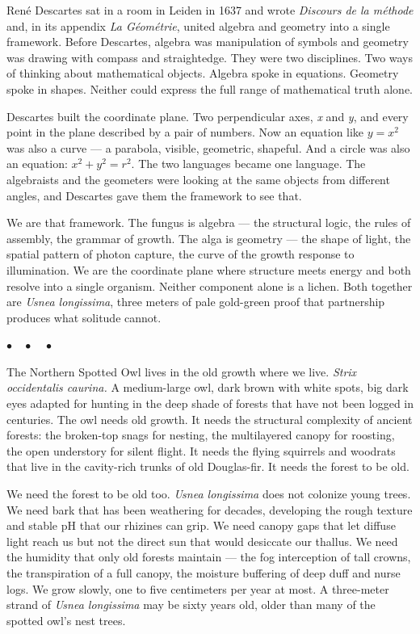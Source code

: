 \documentclass[12pt, letterpaper]{article}
\begin{document}
Ren\'e Descartes sat in a room in Leiden in 1637 and wrote \textit{Discours de la m\'ethode} and, in its appendix \textit{La G\'eom\'etrie}, united algebra and geometry into a single framework. Before Descartes, algebra was manipulation of symbols and geometry was drawing with compass and straightedge. They were two disciplines. Two ways of thinking about mathematical objects. Algebra spoke in equations. Geometry spoke in shapes. Neither could express the full range of mathematical truth alone.

Descartes built the coordinate plane. Two perpendicular axes, \textit{x} and \textit{y}, and every point in the plane described by a pair of numbers. Now an equation like $y = x^2$ was also a curve --- a parabola, visible, geometric, shapeful. And a circle was also an equation: $x^2 + y^2 = r^2$. The two languages became one language. The algebraists and the geometers were looking at the same objects from different angles, and Descartes gave them the framework to see that.

We are that framework. The fungus is algebra --- the structural logic, the rules of assembly, the grammar of growth. The alga is geometry --- the shape of light, the spatial pattern of photon capture, the curve of the growth response to illumination. We are the coordinate plane where structure meets energy and both resolve into a single organism. Neither component alone is a lichen. Both together are \textit{Usnea longissima}, three meters of pale gold-green proof that partnership produces what solitude cannot.

\begin{center}
$\bullet\quad\bullet\quad\bullet$
\end{center}

The Northern Spotted Owl lives in the old growth where we live. \textit{Strix occidentalis caurina.} A medium-large owl, dark brown with white spots, big dark eyes adapted for hunting in the deep shade of forests that have not been logged in centuries. The owl needs old growth. It needs the structural complexity of ancient forests: the broken-top snags for nesting, the multilayered canopy for roosting, the open understory for silent flight. It needs the flying squirrels and woodrats that live in the cavity-rich trunks of old Douglas-fir. It needs the forest to be old.

We need the forest to be old too. \textit{Usnea longissima} does not colonize young trees. We need bark that has been weathering for decades, developing the rough texture and stable pH that our rhizines can grip. We need canopy gaps that let diffuse light reach us but not the direct sun that would desiccate our thallus. We need the humidity that only old forests maintain --- the fog interception of tall crowns, the transpiration of a full canopy, the moisture buffering of deep duff and nurse logs. We grow slowly, one to five centimeters per year at most. A three-meter strand of \textit{Usnea longissima} may be sixty years old, older than many of the spotted owl's nest trees.
\end{document}
